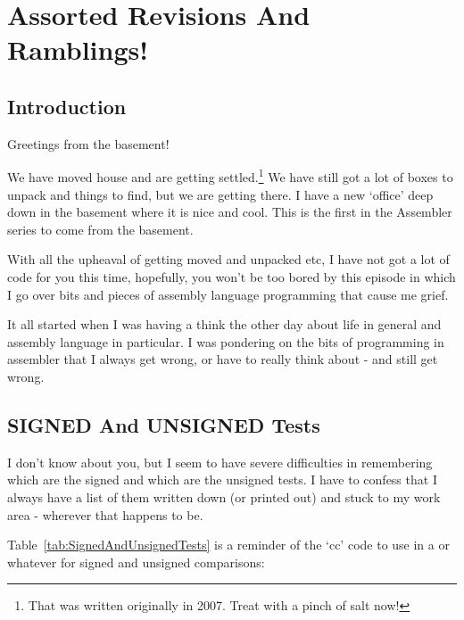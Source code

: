 \chapter{Assorted Revisions And Ramblings!}

\section{Introduction}
\label{ch19-intro}%

Greetings from the basement!

We have moved house and are getting settled.\footnote{That was written originally in 2007. Treat with a pinch of salt now!} We have still got a lot of
        boxes to unpack and things to find, but we are getting there. I have a new
        `office' deep down in the basement where it is nice and cool. This is the first in
        the Assembler series to come from the basement.

With all the upheaval of getting moved and unpacked etc, I have not got a
        lot of code for you this time, hopefully, you won't be too bored by this episode
        in which I go over bits and pieces of assembly language programming that cause me
        grief.

It all started when I was having a think the other day about life in general
        and assembly language in particular. I was pondering on the bits of programming in
        assembler that I always get wrong, or have to really think about -{} and still get
        wrong.

\section{SIGNED And UNSIGNED Tests}
\label{ch19-signed-unsigned}%

I don't know about you, but I seem to have severe difficulties in
        remembering which are the signed and which are the unsigned tests. I have to
        confess that I always have a list of them written down (or printed out) and stuck
        to my work area -{} wherever that happens to be.

Table~\ref{tab:SignedAndUnsignedTests} is a reminder of the `cc' code to use in a  or whatever for signed and unsigned comparisons:

